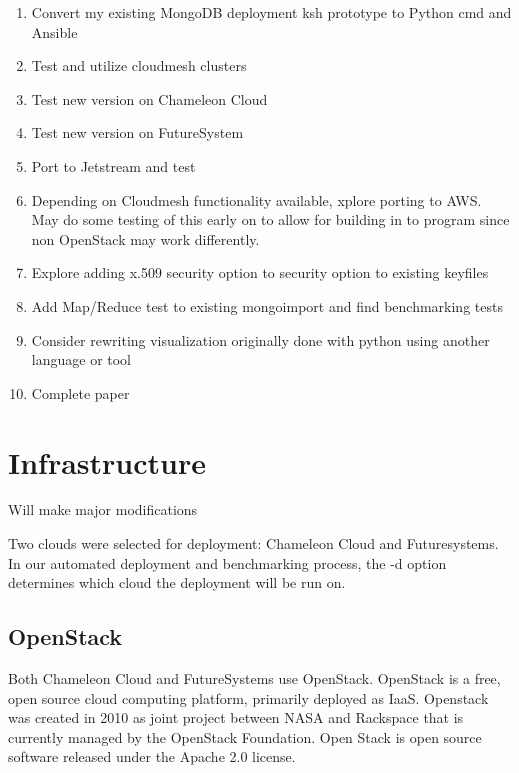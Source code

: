 \documentclass[9pt,twocolumn,twoside]{../../styles/osajnl}
\begin{document}
\vspace{-\topsep}
\begin{enumerate}
\item Convert my existing MongoDB deployment ksh prototype to Python cmd and Ansible
\item Test and utilize cloudmesh clusters
\item Test new version on Chameleon Cloud
\item Test new version on FutureSystem
\item Port to Jetstream and test
\item Depending on Cloudmesh functionality available, xplore porting to AWS.  May do some testing of this early on to allow for building in to program since non OpenStack may work differently.
\item Explore adding x.509 security option to security option to existing keyfiles
\item Add Map/Reduce test to existing mongoimport and find benchmarking tests
\item Consider rewriting visualization originally done with python using another language or tool
\item Complete paper

\end{enumerate}
\vspace{-\topsep}



\section{Infrastructure}

Will make major modifications

Two clouds were selected for deployment: Chameleon Cloud and Futuresystems.  In our automated deployment and benchmarking process, the -d option determines which cloud the deployment will be run on.

\subsection{OpenStack}

Both Chameleon Cloud and FutureSystems use OpenStack.  OpenStack is a free, open source cloud computing platform, primarily deployed as IaaS.  \cite{www-wikiOpenStack}  Openstack was created in 2010 as joint project between NASA and Rackspace that is currently managed by the OpenStack Foundation.  \cite{www-wikiOpenStack} Open Stack is open source software released under the Apache 2.0 license.  \cite{www-openStackFAQ}
\end{document}

